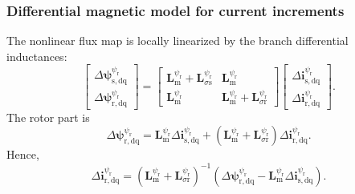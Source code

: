 \begin{frame}
    \frametitle{Differential magnetic model for current increments}
    The nonlinear flux map is locally linearized by the branch differential inductances:
    \begin{equation}
        \begin{bmatrix}
            \Delta\bm{\psi}^{\psi_\mathrm{r}}_{\mathrm{s},\mathrm{dq}} \\
            \Delta\bm{\psi}^{\psi_\mathrm{r}}_{\mathrm{r},\mathrm{dq}}
        \end{bmatrix}
        =
        \begin{bmatrix}
            \bm{L}^{\psi_\mathrm{r}}_\mathrm{m}+\bm{L}^{\psi_\mathrm{r}}_{\sigma\mathrm{s}} & \bm{L}^{\psi_\mathrm{r}}_\mathrm{m}                                             \\
            \bm{L}^{\psi_\mathrm{r}}_\mathrm{m}                                             & \bm{L}^{\psi_\mathrm{r}}_\mathrm{m}+\bm{L}^{\psi_\mathrm{r}}_{\sigma\mathrm{r}}
        \end{bmatrix}
        \begin{bmatrix}
            \Delta\bm{i}^{\psi_\mathrm{r}}_{\mathrm{s},\mathrm{dq}} \\
            \Delta\bm{i}^{\psi_\mathrm{r}}_{\mathrm{r},\mathrm{dq}}
        \end{bmatrix}.
        \label{eq:IM_RFO_v7_diff_model}
    \end{equation}\pause%
    The rotor part is
    \begin{equation}
        \Delta\bm{\psi}^{\psi_\mathrm{r}}_{\mathrm{r},\mathrm{dq}}
        =\bm{L}^{\psi_\mathrm{r}}_\mathrm{m}\Delta\bm{i}^{\psi_\mathrm{r}}_{\mathrm{s},\mathrm{dq}}
        +\left(\bm{L}^{\psi_\mathrm{r}}_\mathrm{m}+\bm{L}^{\psi_\mathrm{r}}_{\sigma\mathrm{r}}\right)\Delta\bm{i}^{\psi_\mathrm{r}}_{\mathrm{r},\mathrm{dq}}.
        \label{eq:IM_RFO_v7_diff_rotor_part}
    \end{equation}
    Hence,
    \begin{equation}
        \Delta\bm{i}^{\psi_\mathrm{r}}_{\mathrm{r},\mathrm{dq}}
        =\left(\bm{L}^{\psi_\mathrm{r}}_\mathrm{m}+\bm{L}^{\psi_\mathrm{r}}_{\sigma\mathrm{r}}\right)^{-1}
        \left(\Delta\bm{\psi}^{\psi_\mathrm{r}}_{\mathrm{r},\mathrm{dq}}-\bm{L}^{\psi_\mathrm{r}}_\mathrm{m}\Delta\bm{i}^{\psi_\mathrm{r}}_{\mathrm{s},\mathrm{dq}}\right).
        \label{eq:IM_RFO_v7_delta_ir_elim}
    \end{equation}
\end{frame}

